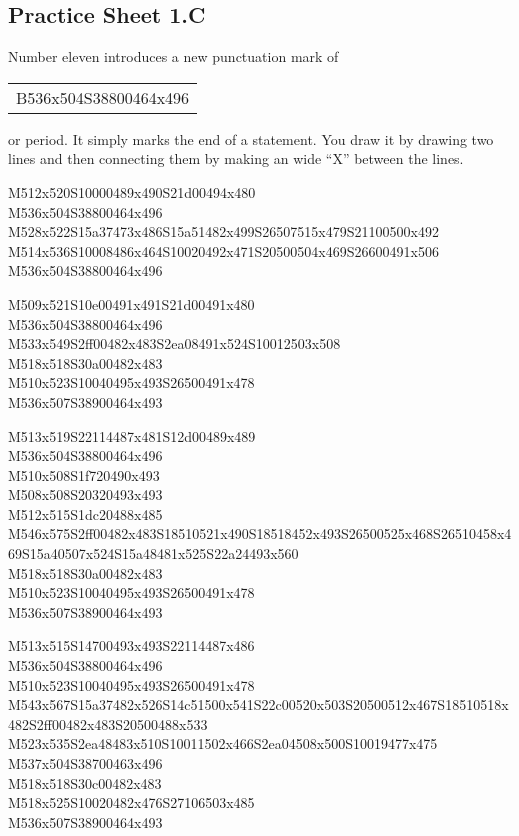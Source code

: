 \documentclass{article}
\begin{document}
\subsection{Practice Sheet 1.C}

Number eleven introduces a new punctuation mark of \begin{tabular}{c}B536x504S38800464x496\end{tabular} or period.
It simply marks the end of a statement.
You draw it by drawing two lines and then connecting them by making an wide ``X'' between the lines.

\begin{multicols}{5}
\begin{center}

M512x520S10000489x490S21d00494x480 %
\\M536x504S38800464x496 %
\\M528x522S15a37473x486S15a51482x499S26507515x479S21100500x492 %
\\M514x536S10008486x464S10020492x471S20500504x469S26600491x506 %
\\M536x504S38800464x496 %
\vfil
\columnbreak

M509x521S10e00491x491S21d00491x480 %
\\M536x504S38800464x496 %
\\M533x549S2ff00482x483S2ea08491x524S10012503x508 %
\\M518x518S30a00482x483 %
\\M510x523S10040495x493S26500491x478 %
\\M536x507S38900464x493 %
\vfil
\columnbreak

M513x519S22114487x481S12d00489x489 %
\\M536x504S38800464x496 %
\\M510x508S1f720490x493 %
\\M508x508S20320493x493 %
\\M512x515S1dc20488x485 %
\\M546x575S2ff00482x483S18510521x490S18518452x493S26500525x468S26510458x469S15a40507x524S15a48481x525S22a24493x560 %
\\M518x518S30a00482x483 %
\\M510x523S10040495x493S26500491x478 %
\\M536x507S38900464x493 %
\vfil
\columnbreak

M513x515S14700493x493S22114487x486 %
\\M536x504S38800464x496 %
\\M510x523S10040495x493S26500491x478 %
\\M543x567S15a37482x526S14c51500x541S22c00520x503S20500512x467S18510518x482S2ff00482x483S20500488x533 %
\\M523x535S2ea48483x510S10011502x466S2ea04508x500S10019477x475 %
\\M537x504S38700463x496 %
\\M518x518S30c00482x483 %
\\M518x525S10020482x476S27106503x485 %
\\M536x507S38900464x493 %
\vfil
\columnbreak


\end{center}
\end{multicols}
\end{document}
